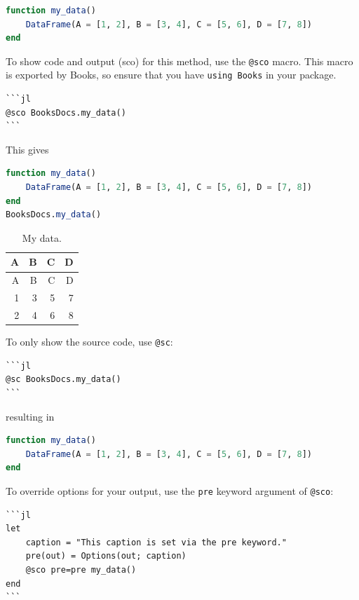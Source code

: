 \documentclass[
  notoc %
]{tufte-book}
\newcommand{\passthrough}[1]{#1}
\begin{document}
\begin{lstlisting}[language=Julia]
function my_data()
    DataFrame(A = [1, 2], B = [3, 4], C = [5, 6], D = [7, 8])
end
\end{lstlisting}

To show code and output (sco) for this method, use the
\passthrough{\lstinline!@sco!} macro. This macro is exported by Books,
so ensure that you have \passthrough{\lstinline!using Books!} in your
package.

\begin{lstlisting}
```jl
@sco BooksDocs.my_data()
```
\end{lstlisting}

This gives

\begin{lstlisting}[language=Julia]
function my_data()
    DataFrame(A = [1, 2], B = [3, 4], C = [5, 6], D = [7, 8])
end
BooksDocs.my_data()
\end{lstlisting}

\hypertarget{tbl:my_data}{}
\begin{longtable}[]{@{}rrrr@{}}
\caption{\label{tbl:my_data}My data.}\tabularnewline
\toprule
A & B & C & D \\
\midrule
\endfirsthead
\toprule
A & B & C & D \\
\midrule
\endhead
1 & 3 & 5 & 7 \\
2 & 4 & 6 & 8 \\
\bottomrule
\end{longtable}

To only show the source code, use \passthrough{\lstinline!@sc!}:

\begin{lstlisting}
```jl
@sc BooksDocs.my_data()
```
\end{lstlisting}

resulting in

\begin{lstlisting}[language=Julia]
function my_data()
    DataFrame(A = [1, 2], B = [3, 4], C = [5, 6], D = [7, 8])
end
\end{lstlisting}

To override options for your output, use the
\passthrough{\lstinline!pre!} keyword argument of
\passthrough{\lstinline!@sco!}:

\begin{lstlisting}
```jl
let
    caption = "This caption is set via the pre keyword."
    pre(out) = Options(out; caption)
    @sco pre=pre my_data()
end
```
\end{lstlisting}
\end{document}
